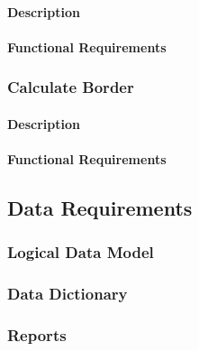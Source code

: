             \paragraph{Description}
            \paragraph{Functional Requirements}

        \subsubsection{Calculate Border}
            \paragraph{Description}
            \paragraph{Functional Requirements}

    \subsection{Data Requirements}
        \subsubsection{Logical Data Model}
        \subsubsection{Data Dictionary}
        \subsubsection{Reports}







